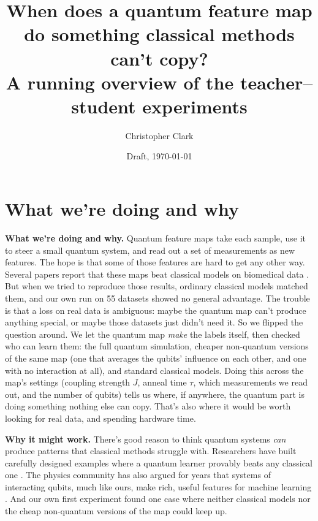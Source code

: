 \documentclass[11pt]{article}
\title{\bfseries When does a quantum feature map do something classical methods can't copy?\\[0.3em]
\large A running overview of the teacher--student experiments}
\author{Christopher Clark}
\date{Draft, \today}
\begin{document}
\maketitle

\section{What we're doing and why}

\textbf{What we're doing and why.} Quantum feature maps take each sample, use it to steer a small quantum
system, and read out a set of measurements as new features. The hope is that some of those features are hard
to get any other way. Several papers report that these maps beat classical models on biomedical data
\citep[e.g.][]{Simen2025}. But when we tried to reproduce those results, ordinary classical models matched them,
and our own run on 55 datasets showed no general advantage. The trouble is that a loss on real data is
ambiguous: maybe the quantum map can't produce anything special, or maybe those datasets just didn't need it.
So we flipped the question around. We let the quantum map \emph{make} the labels itself, then checked who can
learn them: the full quantum simulation, cheaper non-quantum versions of the same map (one that averages the
qubits' influence on each other, and one with no interaction at all), and standard classical models. Doing
this across the map's settings (coupling strength $J$, anneal time $\tau$, which measurements we read out, and
the number of qubits) tells us where, if anywhere, the quantum part is doing something nothing else can copy.
That's also where it would be worth looking for real data, and spending hardware time.

\textbf{Why it might work.} There's good reason to think quantum systems \emph{can} produce patterns that
classical methods struggle with. Researchers have built carefully designed examples where a quantum learner
provably beats any classical one \citep{Liu2021}. The physics community has also argued for years that
systems of interacting qubits, much like ours, make rich, useful features for machine learning
\citep{Fujii2017}. And our own first experiment found one case where neither classical models nor the cheap
non-quantum versions of the map could keep up.
\end{document}
